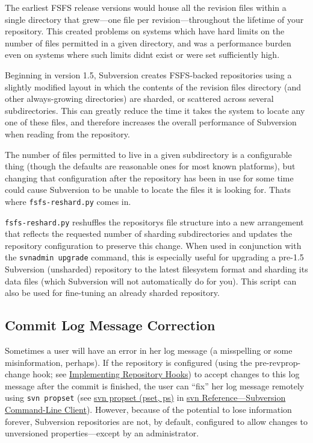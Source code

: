 The earliest FSFS release versions would house all the revision files
within a single directory that grew---one file per revision---throughout
the lifetime of your repository. This created problems on systems which
have hard limits on the number of files permitted in a given directory,
and was a performance burden even on systems where such limits
didn\textquotesingle t exist or were set sufficiently high.

Beginning in version 1.5, Subversion creates FSFS-backed repositories
using a slightly modified layout in which the contents of the revision
files directory (and other always-growing directories) are sharded, or
scattered across several subdirectories. This can greatly reduce the
time it takes the system to locate any one of these files, and therefore
increases the overall performance of Subversion when reading from the
repository.

The number of files permitted to live in a given subdirectory is a
configurable thing (though the defaults are reasonable ones for most
known platforms), but changing that configuration after the repository
has been in use for some time could cause Subversion to be unable to
locate the files it is looking for. That\textquotesingle s where
\texttt{fsfs-reshard.py} comes in.

\texttt{fsfs-reshard.py} reshuffles the repository\textquotesingle s
file structure into a new arrangement that reflects the requested number
of sharding subdirectories and updates the repository configuration to
preserve this change. When used in conjunction with the
\texttt{svnadmin\ upgrade} command, this is especially useful for
upgrading a pre-1.5 Subversion (unsharded) repository to the latest
filesystem format and sharding its data files (which Subversion will not
automatically do for you). This script can also be used for fine-tuning
an already sharded repository.

\subsection{Commit Log Message
Correction}\label{svn.reposadmin.maint.setlog}

Sometimes a user will have an error in her log message (a misspelling or
some misinformation, perhaps). If the repository is configured (using
the pre-revprop-change hook; see
\hyperref[svn.reposadmin.hooks]{Implementing Repository Hooks}) to
accept changes to this log message after the commit is finished, the
user can ``fix'' her log message remotely using \texttt{svn\ propset}
(see \hyperref[svn.ref.svn.c.propset]{svn propset (pset, ps)} in
\hyperref[svn.ref.svn]{svn Reference---Subversion Command-Line Client}).
However, because of the potential to lose information forever,
Subversion repositories are not, by default, configured to allow changes
to unversioned properties---except by an administrator.

